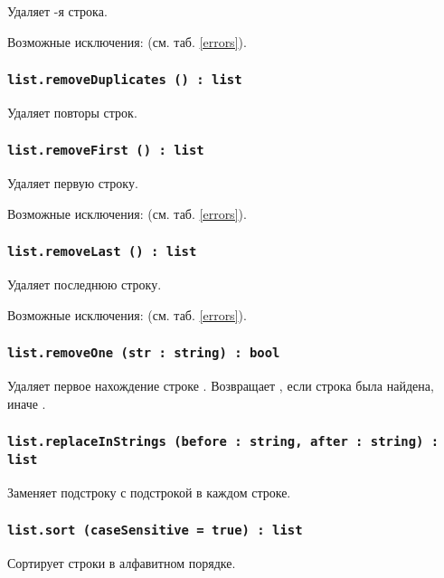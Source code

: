 Удаляет -я строка.

Возможные исключения:  (см. таб. \ref{errors}).

\subsubsection{\lstinline|list.removeDuplicates () : list|}

Удаляет повторы строк.

\subsubsection{\lstinline|list.removeFirst () : list|}

Удаляет первую строку.

Возможные исключения:  (см. таб. \ref{errors}).

\subsubsection{\lstinline|list.removeLast () : list|}

Удаляет последнюю строку.

Возможные исключения:  (см. таб. \ref{errors}).

\subsubsection{\lstinline|list.removeOne (str : string) : bool|}

Удаляет первое нахождение строке . Возвращает \true, если строка была найдена, иначе \false.

\subsubsection{\lstinline|list.replaceInStrings (before : string, after : string) : list|}

Заменяет подстроку  с подстрокой  в каждом строке.

\subsubsection{\lstinline|list.sort (caseSensitive = true) : list|}

Сортирует строки в алфавитном порядке.

